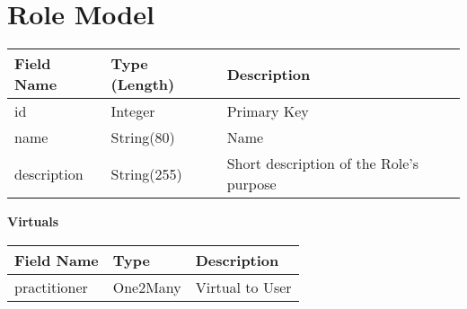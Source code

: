 \documentclass[letterpaper,10pt,english]{sphinxmanual}
\begin{document}
\section{Role Model}
\label{dev-models:role-model-label}\label{dev-models:role-model}
\begin{tabulary}{\linewidth}{|L|L|L|}
\hline
\textsf{\relax 
Field Name
} & \textsf{\relax 
Type (Length)
} & \textsf{\relax 
Description
}\\
\hline
id
 & 
Integer
 & 
Primary Key
\\

name
 & 
String(80)
 & 
Name
\\

description
 & 
String(255)
 & 
Short description of the Role's purpose
\\
\hline\end{tabulary}


\textbf{Virtuals}

\begin{tabulary}{\linewidth}{|L|L|L|}
\hline
\textsf{\relax 
Field Name
} & \textsf{\relax 
Type
} & \textsf{\relax 
Description
}\\
\hline
practitioner
 & 
One2Many
 & 
Virtual to User
\\
\hline\end{tabulary}
\end{document}
